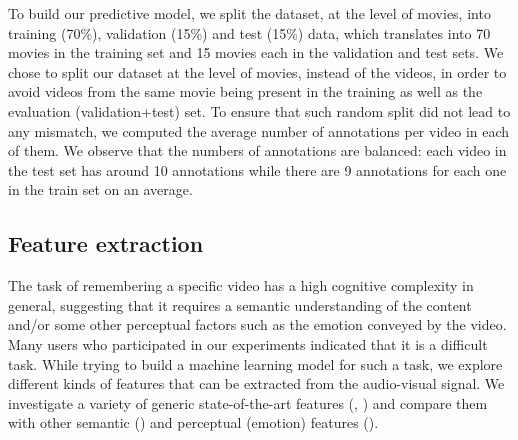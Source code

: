 \documentclass[sigconf]{acmart}
\begin{document}
To build our predictive model, we split the dataset, at the level of movies, into training (70\%), validation (15\%) and test (15\%) data, which translates into 70 movies in the training set and 15 movies each in the validation and test sets.
We chose to split our dataset at the level of movies, instead of the videos, in order to avoid videos from the same movie being present in the training as well as the evaluation (validation+test) set. To ensure that such random split did not lead to any mismatch, we computed the average number of annotations per video in each of them. 
We observe that the numbers of annotations are balanced: each video in the test set has around 10 annotations while there are 9 annotations for each one in the train set on an average.

\subsection{Feature extraction}
\label{feat-extr}
The task of remembering a specific video has a high cognitive complexity in general, suggesting that it requires a semantic understanding of the content and/or some other perceptual factors such as the emotion conveyed by the video. 
Many users who participated in our experiments indicated that it is a difficult task.
While trying to build a machine learning model for such a task, we explore different kinds of features that can be extracted from the audio-visual signal.
We investigate a variety of generic state-of-the-art features (\cite{c3d-feat}, \cite{audioset-feat}) and compare them with other semantic (\cite{caption-feat}) and perceptual (emotion) features (\cite{sb-feat}).

\end{document}
